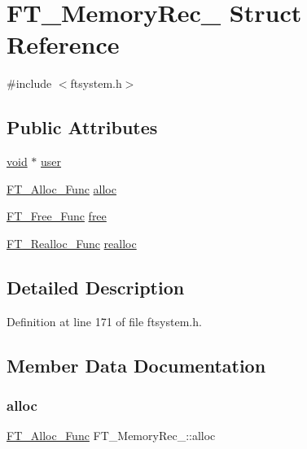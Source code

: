 \hypertarget{struct_f_t___memory_rec__}{}\section{F\+T\+\_\+\+Memory\+Rec\+\_\+ Struct Reference}
\label{struct_f_t___memory_rec__}


{\ttfamily \#include $<$ftsystem.\+h$>$}

\subsection*{Public Attributes}
\begin{DoxyCompactItemize}
\item 
\mbox{\hyperlink{_s_d_l__opengles2__gl2ext_8h_ae5d8fa23ad07c48bb609509eae494c95}{void}} $\ast$ \mbox{\hyperlink{struct_f_t___memory_rec___aae5bc614434ba4525e37d7faaf03c4b7}{user}}
\item 
\mbox{\hyperlink{ftsystem_8h_ae36240d207415b573f5b84416b426540}{F\+T\+\_\+\+Alloc\+\_\+\+Func}} \mbox{\hyperlink{struct_f_t___memory_rec___a2269eada6afbb008fe5c73707145410c}{alloc}}
\item 
\mbox{\hyperlink{ftsystem_8h_abbf66b34e6c3a7f9564cbe3d6fa6c6fb}{F\+T\+\_\+\+Free\+\_\+\+Func}} \mbox{\hyperlink{struct_f_t___memory_rec___a83ab2422bd9265d8731b9e5e368ba240}{free}}
\item 
\mbox{\hyperlink{ftsystem_8h_a264ca9013613b2454d64987bf768ac93}{F\+T\+\_\+\+Realloc\+\_\+\+Func}} \mbox{\hyperlink{struct_f_t___memory_rec___a5ce3424cc72e898fe973ffeabe44a95c}{realloc}}
\end{DoxyCompactItemize}


\subsection{Detailed Description}


Definition at line 171 of file ftsystem.\+h.



\subsection{Member Data Documentation}
\mbox{\label{struct_f_t___memory_rec___a2269eada6afbb008fe5c73707145410c}} 
\subsubsection{\texorpdfstring{alloc}{alloc}}
{\footnotesize\ttfamily \mbox{\hyperlink{ftsystem_8h_ae36240d207415b573f5b84416b426540}{F\+T\+\_\+\+Alloc\+\_\+\+Func}} F\+T\+\_\+\+Memory\+Rec\+\_\+\+::alloc}



